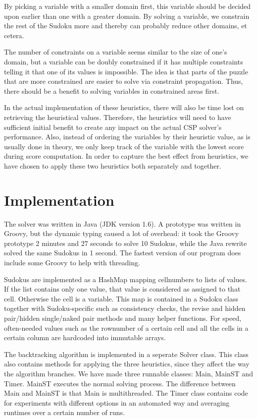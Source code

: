 \documentclass[11pt]{article} %
\begin{document}
By picking a variable with a smaller domain first, this variable should be decided upon earlier than one with a greater domain. By solving a variable, we constrain the rest of the Sudoku more and thereby can probably reduce other domains, et cetera.

The number of constraints on a variable seems similar to the size of one's domain, but a variable can be doubly constrained if it has multiple constraints telling it that one of its values is impossible. The idea is that parts of the puzzle that are more constrained are easier to solve via constraint propagation. Thus, there should be a benefit to solving variables in constrained areas first.

In the actual implementation of these heuristics, there will also be time lost on retrieving the heuristical values. Therefore, the heuristics will need to have sufficient initial benefit to create any impact on the actual CSP solver's performance. Also, instead of ordering the variables by their heuristic value, as is usually done in theory, we only keep track of the variable with the lowest score during score computation. In order to capture the best effect from heuristics, we have chosen to apply these two heuristics both separately and together.

\section{Implementation}
\label{sec:impl}

The solver was written in Java (JDK version 1.6). A prototype was written in Groovy, but the dynamic typing caused a lot of overhead: it took the Groovy prototype 2 minutes and 27 seconds to solve 10 Sudokus, while the Java rewrite solved the same Sudokus in 1 second. The fastest version of our program does include some Groovy to help with threading.

Sudokus are implemented as a HashMap mapping cellnumbers to lists of values. If the list contains only one value, that value is considered as assigned to that cell. Otherwise the cell is a variable. This map is contained in a Sudoku class together with Sudoku-specific such as consistency checks, the revise and hidden pair/hidden single/naked pair methods and many helper functions. For speed, often-needed values such as the rownumber of a certain cell and all the cells in a certain column are hardcoded into immutable arrays.

The backtracking algorithm is implemented in a seperate Solver class. This class also contains methods for applying the three heuristics, since they affect the way the algorithm branches.
We have made three runnable classes: Main, MainST and Timer. MainST executes the normal solving process. The difference between Main and MainST is that Main is multithreaded. The Timer class contains code for experiments with different options in an automated way and averaging runtimes over a certain number of runs.
\end{document}
